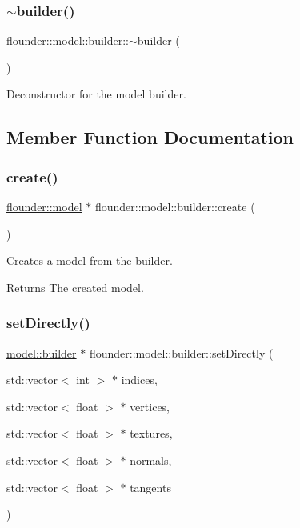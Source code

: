 \subsubsection{\texorpdfstring{$\sim$builder()}{~builder()}}
{\footnotesize\ttfamily flounder\+::model\+::builder\+::$\sim$builder (\begin{DoxyParamCaption}{ }\end{DoxyParamCaption})}



Deconstructor for the model builder. 



\subsection{Member Function Documentation}
\mbox{\label{classflounder_1_1model_1_1builder_a9809c3839db58e8b88ac6606e16f5401}} 
\subsubsection{\texorpdfstring{create()}{create()}}
{\footnotesize\ttfamily \hyperlink{classflounder_1_1model}{flounder\+::model} $\ast$ flounder\+::model\+::builder\+::create (\begin{DoxyParamCaption}{ }\end{DoxyParamCaption})}



Creates a model from the builder. 

\begin{DoxyReturn}{Returns}
The created model. 
\end{DoxyReturn}
\mbox{\label{classflounder_1_1model_1_1builder_ad85587080624eb2721b1c8fffc5fc008}} 
\subsubsection{\texorpdfstring{set\+Directly()}{setDirectly()}}
{\footnotesize\ttfamily \hyperlink{classflounder_1_1model_1_1builder}{model\+::builder} $\ast$ flounder\+::model\+::builder\+::set\+Directly (\begin{DoxyParamCaption}\item[{std\+::vector$<$ int $>$ $\ast$}]{indices,  }\item[{std\+::vector$<$ float $>$ $\ast$}]{vertices,  }\item[{std\+::vector$<$ float $>$ $\ast$}]{textures,  }\item[{std\+::vector$<$ float $>$ $\ast$}]{normals,  }\item[{std\+::vector$<$ float $>$ $\ast$}]{tangents }\end{DoxyParamCaption})}



